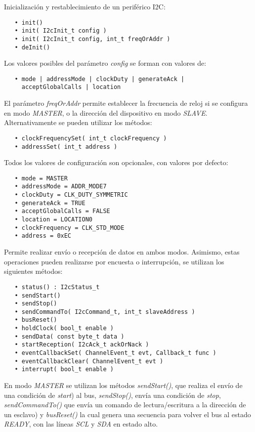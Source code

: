 
Inicialización y restablecimiento de un periférico I2C:

\begin{verbatim}
   • init()
   • init( I2cInit_t config )
   • init( I2cInit_t config, int_t freqOrAddr )
   • deInit()
\end{verbatim}

Los valores posibles del parámetro \emph{config} se forman con valores de:

\begin{verbatim}
   • mode | addressMode | clockDuty | generateAck |
     acceptGlobalCalls | location
\end{verbatim}

El parámetro \emph{freqOrAddr} permite establecer la frecuencia de reloj si se configura en modo \emph{MASTER}, o la dirección del dispositivo en modo \emph{SLAVE}. Alternativamente se pueden utilizar los métodos:

\begin{verbatim}
   • clockFrequencySet( int_t clockFrequency )
   • addressSet( int_t address )
\end{verbatim}

Todos los valores de configuración son opcionales, con valores por defecto:

\begin{verbatim}
   • mode = MASTER
   • addressMode = ADDR_MODE7
   • clockDuty = CLK_DUTY_SYMMETRIC
   • generateAck = TRUE
   • acceptGlobalCalls = FALSE
   • location = LOCATION0
   • clockFrequency = CLK_STD_MODE
   • address = 0xEC
\end{verbatim}

Permite realizar envío o recepción de datos en ambos modos. Asimismo, estas operaciones pueden realizarse por encuesta o interrupción, se utilizan los siguientes métodos:

\begin{verbatim}
   • status() : I2cStatus_t
   • sendStart()
   • sendStop()
   • sendCommandTo( I2cCommand_t, int_t slaveAddress )
   • busReset()
   • holdClock( bool_t enable )
   • sendData( const byte_t data )
   • startReception( I2cAck_t ackOrNack )
   • eventCallbackSet( ChannelEvent_t evt, Callback_t func )
   • eventCallbackClear( ChannelEvent_t evt )
   • interrupt( bool_t enable )
\end{verbatim}

En modo \emph{MASTER} se utilizan los métodos \emph{sendStart()}, que realiza el envío de una condición de \emph{start}) al bus, \emph{sendStop()}, envía una condición de \emph{stop}, \emph{sendCommandTo()} que envía un comando de lectura/escritura a la dirección de un esclavo) y \emph{busReset()} la cual genera una secuencia para volver el bus al estado \emph{READY}, con las líneas \emph{SCL} y \emph{SDA} en estado alto.

